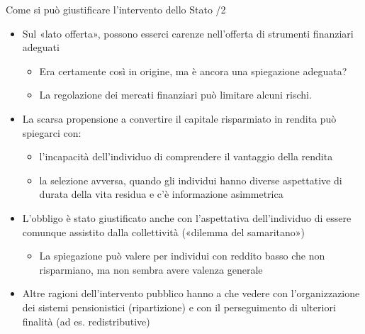\documentclass[aspectratio=64,11pt]{beamer}
\begin{document}
\begin{frame}{Come si può giustificare l'intervento dello Stato /2}
\begin{itemize}
\item Sul «lato offerta», possono esserci carenze nell'offerta di strumenti
finanziari adeguati
\begin{itemize}
\item Era certamente così in origine, ma è ancora una spiegazione adeguata?
\item La regolazione dei mercati finanziari può limitare alcuni rischi.
\end{itemize}
\item La scarsa propensione a convertire il capitale risparmiato in rendita può
spiegarci con:
\begin{itemize}
\item l'incapacità dell'individuo di comprendere il vantaggio della rendita
\item la \alert{selezione avversa}, quando gli individui hanno diverse aspettative di
durata della vita residua e c'è informazione asimmetrica
\end{itemize}
\item L'obbligo è stato giustificato anche con l'aspettativa dell'individuo di
essere comunque assistito dalla collettività («dilemma del samaritano»)
\begin{itemize}
\item La spiegazione può valere per individui con reddito basso che non
risparmiano, ma non sembra avere valenza generale
\end{itemize}
\item Altre ragioni dell'intervento pubblico hanno a che vedere con
l'organizzazione dei sistemi pensionistici (ripartizione) e con il
perseguimento di ulteriori finalità (ad es. redistributive)
\end{itemize}
\end{frame}
\end{document}
